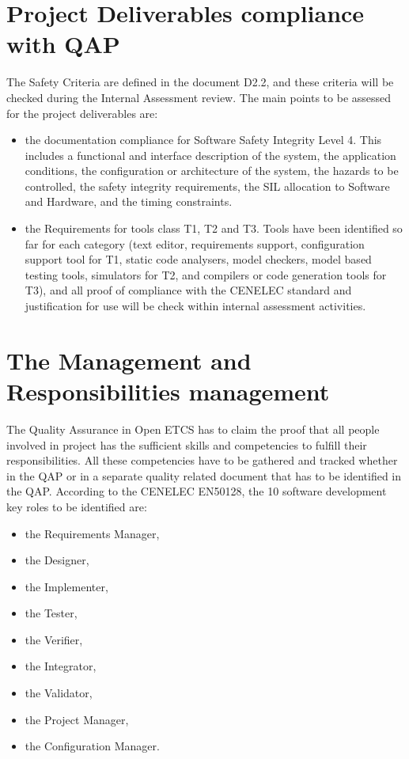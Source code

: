 \documentclass{template/openetcs_report}
\begin{document}
\section{Project Deliverables compliance with QAP}
The Safety Criteria are defined in the document D2.2, and these criteria will be checked during the Internal Assessment review. The main points to be assessed for the project deliverables are:
\begin{itemize}
\item the documentation compliance for Software Safety Integrity Level 4. This includes a functional and interface description of the system, the application conditions, the configuration or architecture of the system, the hazards to be controlled, the safety integrity requirements, the SIL allocation to Software and Hardware, and the timing constraints.
\item the Requirements for tools class T1, T2 and T3. Tools have been identified so far for each category (text editor, requirements support, configuration support tool for T1,  static code analysers, model checkers, model based testing tools, simulators for T2, and compilers or code generation tools for T3), and all proof of compliance with the CENELEC standard and justification for use will be check within internal assessment activities.
\end{itemize}

\section{The Management and Responsibilities management}
The Quality Assurance in Open ETCS has to claim the proof that all people involved in project has the sufficient skills and competencies to fulfill their responsibilities. All these competencies have to be gathered and tracked whether in the QAP or in a separate quality related document that has to be identified in the QAP.
According to the CENELEC EN50128, the 10 software development key roles to be identified are:
\begin{itemize}
\item the Requirements Manager,
\item the Designer,
\item the Implementer,
\item the Tester,
\item the Verifier,
\item the Integrator,
\item the Validator,
\item the Project Manager,
\item the Configuration Manager.
\end{itemize}
\end{document}
